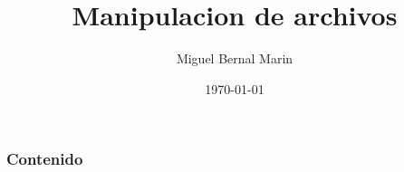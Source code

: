 \documentclass[aspectratio=169]{beamer}
\title{Manipulacion de archivos} %
\author{Miguel Bernal Marin} %
\institute[Escuela] %
{
 Nombre de la Institución\\%
\medskip
\textit{correo} %
}
\date{
    \today
} %
\begin{document}
\begin{frame}
    \titlepage
\end{frame}

\begin{frame}
    \frametitle{Contenido}
    \tableofcontents
\end{frame}


\end{document}
